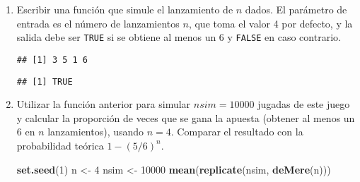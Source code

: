 \documentclass[
]{book}
\newenvironment{Shaded}{\begin{snugshade}}{\end{snugshade}}
\newcommand{\ControlFlowTok}[1]{\textcolor[rgb]{0.13,0.29,0.53}{\textbf{#1}}}
\newcommand{\DataTypeTok}[1]{\textcolor[rgb]{0.13,0.29,0.53}{#1}}
\newcommand{\DecValTok}[1]{\textcolor[rgb]{0.00,0.00,0.81}{#1}}
\newcommand{\KeywordTok}[1]{\textcolor[rgb]{0.13,0.29,0.53}{\textbf{#1}}}
\newcommand{\NormalTok}[1]{#1}
\newcommand{\OperatorTok}[1]{\textcolor[rgb]{0.81,0.36,0.00}{\textbf{#1}}}
\newcommand{\OtherTok}[1]{\textcolor[rgb]{0.56,0.35,0.01}{#1}}
\newcommand{\StringTok}[1]{\textcolor[rgb]{0.31,0.60,0.02}{#1}}
\theoremstyle{break}
\theoremstyle{definition}
\theoremstyle{definition}
\theoremstyle{definition}
\theoremstyle{remark}
\begin{document}
\begin{enumerate}
\def\labelenumi{\alph{enumi})}
\item
  Escribir una función que simule el lanzamiento de \(n\) dados. El
  parámetro de entrada es el número de lanzamientos \(n\), que toma
  el valor 4 por defecto, y la salida debe ser \texttt{TRUE} si se
  obtiene al menos un 6 y \texttt{FALSE} en caso contrario.

\begin{Shaded}
\end{Shaded}

\begin{verbatim}
## [1] 3 5 1 6
\end{verbatim}

\begin{Shaded}
\end{Shaded}

\begin{verbatim}
## [1] TRUE
\end{verbatim}
\item
  Utilizar la función anterior para simular \(nsim=10000\) jugadas
  de este juego y calcular la proporción de veces que se gana la
  apuesta (obtener al menos un 6 en \(n\) lanzamientos), usando
  \(n=4\). Comparar el resultado con la probabilidad teórica
  \(1-(5/6)^{n}\).

\begin{Shaded}
\begin{Highlighting}[]
\KeywordTok{set.seed}\NormalTok{(}\DecValTok{1}\NormalTok{)}
\NormalTok{n <-}\StringTok{ }\DecValTok{4}
\NormalTok{nsim <-}\StringTok{ }\DecValTok{10000}
\KeywordTok{mean}\NormalTok{(}\KeywordTok{replicate}\NormalTok{(nsim, }\KeywordTok{deMere}\NormalTok{(n)))}
\end{Highlighting}
\end{Shaded}


\end{enumerate}
\end{document}
